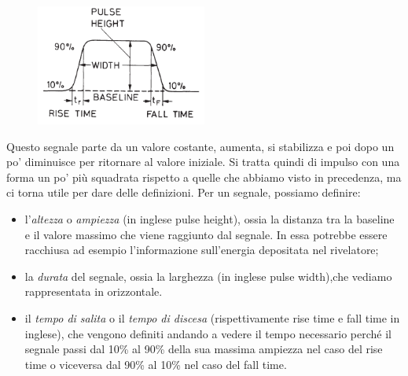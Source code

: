 \begin{figure}[H]
   \centering
   \includegraphics[width=0.5\textwidth]{immagini/terminologia_segnali_1.png}
\end{figure}

Questo segnale parte da un valore costante, aumenta, si stabilizza e poi dopo un po' diminuisce per ritornare al valore iniziale. Si tratta quindi di impulso con una forma un po' più squadrata rispetto a quelle che abbiamo visto in precedenza, ma ci torna utile per dare delle definizioni. Per un segnale, possiamo definire:

\begin{itemize}[leftmargin=0.5cm]
   \item l'\textit{altezza} o \textit{ampiezza} (in inglese pulse height), ossia la distanza tra la baseline e il valore massimo che viene raggiunto dal segnale. In essa potrebbe essere racchiusa ad esempio l'informazione sull'energia depositata nel rivelatore;
   \item la \textit{durata} del segnale, ossia la larghezza (in inglese pulse width),che vediamo rappresentata in orizzontale.
   \item il \textit{tempo di salita} o il \textit{tempo di discesa} (rispettivamente rise time e fall time in inglese), che vengono definiti andando a vedere il tempo necessario perché il segnale passi dal 10\% al 90\% della sua massima ampiezza nel caso del rise time o viceversa dal 90\% al 10\% nel caso del fall time.
\end{itemize}


